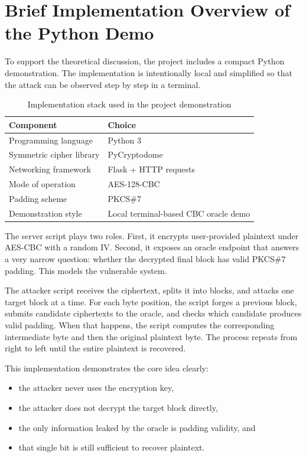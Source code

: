 \section{Brief Implementation Overview of the Python Demo}

To support the theoretical discussion, the project includes a compact Python demonstration. The implementation is intentionally local and simplified so that the attack can be observed step by step in a terminal.

\begin{table}[H]
    \centering
    \caption{Implementation stack used in the project demonstration}
    \label{tab:implementation-stack}
    \begin{tabular}{@{}ll@{}}
        \toprule
        Component & Choice \\
        \midrule
        Programming language & Python 3 \\
        Symmetric cipher library & PyCryptodome \\
        Networking framework & Flask + HTTP requests \\
        Mode of operation & AES-128-CBC \\
        Padding scheme & PKCS\#7 \\
        Demonstration style & Local terminal-based CBC oracle demo \\
        \bottomrule
    \end{tabular}
\end{table}

The server script plays two roles. First, it encrypts user-provided plaintext under AES-CBC with a random IV. Second, it exposes an oracle endpoint that answers a very narrow question: whether the decrypted final block has valid PKCS\#7 padding. This models the vulnerable system.

The attacker script receives the ciphertext, splits it into blocks, and attacks one target block at a time. For each byte position, the script forges a previous block, submits candidate ciphertexts to the oracle, and checks which candidate produces valid padding. When that happens, the script computes the corresponding intermediate byte and then the original plaintext byte. The process repeats from right to left until the entire plaintext is recovered.

This implementation demonstrates the core idea clearly:

\begin{itemize}
    \item the attacker never uses the encryption key,
    \item the attacker does not decrypt the target block directly,
    \item the only information leaked by the oracle is padding validity, and
    \item that single bit is still sufficient to recover plaintext.
\end{itemize}

